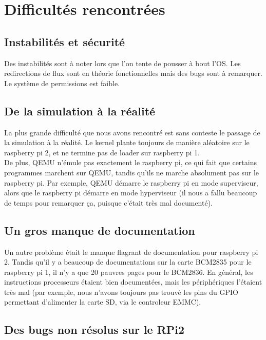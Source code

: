 \documentclass[a4paper]{article}
\begin{document}
\section{Difficultés rencontrées}

\subsection{Instabilités et sécurité}
Des instabilités sont à noter lors que l'on tente de pousser à bout l'OS.
Les redirections de flux sont en théorie fonctionnelles mais des bugs sont à remarquer.
Le système de permissions est faible.

\subsection{De la simulation à la réalité}

La plus grande difficulté que nous avons rencontré est sans conteste le passage
de la simulation à la réalité. Le kernel plante toujours de manière aléatoire
sur le raspberry pi 2, et ne termine pas de loader sur raspberry pi 1.\\

De plus, QEMU n'émule pas exactement le raspberry pi, ce qui fait que certains
programmes marchent sur QEMU, tandis qu'ils ne marche absolument pas sur le
raspberry pi. Par exemple, QEMU démarre le raspberry pi en mode superviseur,
alors que le raspberry pi démarre en mode hyperviseur (il nous a fallu beaucoup
de temps pour remarquer ça, puisque c'était très mal documenté).

\subsection{Un gros manque de documentation}

Un autre problème était le manque flagrant de documentation pour raspberry pi 2.
Tandis qu'il y a beaucoup de documentations sur la carte BCM2835 pour le
raspberry pi 1, il n'y a que 20 pauvres pages pour le BCM2836. En général, les
instructions processeurs étaient bien documentées, mais les périphériques
l'étaient très mal (par exemple, nous n'avons toujours pas trouvé les pins du
GPIO permettant d'alimenter la carte SD, via le controleur EMMC).

\subsection{Des bugs non résolus sur le RPi2}
\end{document}
